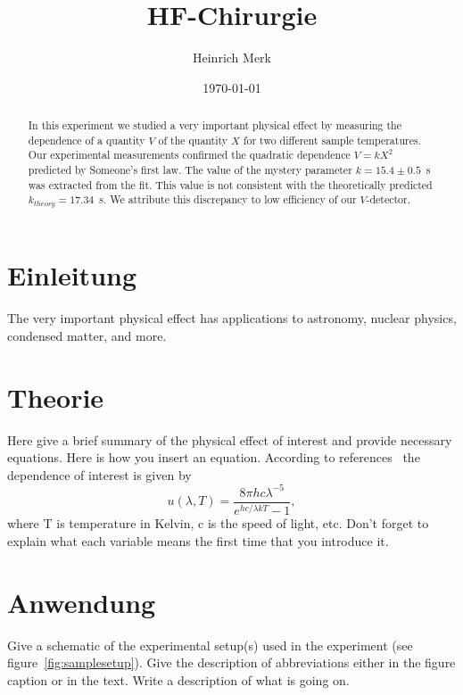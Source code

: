 \documentclass[letterpaper,12pt]{article}
\begin{document}
	
	\title{HF-Chirurgie}
	\author{Heinrich Merk}
	\date{\today}
	\maketitle
	
	\begin{abstract}
		In this experiment we studied a very important physical effect by measuring the
		dependence of a quantity $V$ of the quantity $X$ for two different sample
		temperatures.  Our experimental measurements confirmed the quadratic dependence
		$V = kX^2$ predicted by Someone's first law. The value of the mystery parameter
		$k = 15.4\pm 0.5$~s was extracted from the fit. This value is
		not consistent with the theoretically predicted $k_{theory}=17.34$~s. We attribute this
		discrepancy to low efficiency of our $V$-detector.
	\end{abstract}
	
	\section{Einleitung}
	
	The very important physical effect has applications to astronomy, nuclear physics, condensed matter, and more. 
	
	
	\section{Theorie}
	
	Here give a brief summary of the physical effect of interest and provide
	necessary equations. Here is how you insert an equation. According to
	references~\cite{melissinos, Cyr, Wiki} the dependence of interest is given
	by
	\begin{equation} \label{eq:aperp} %
		u(\lambda,T)=\frac{8\pi hc\lambda^{-5}}{e^{hc/\lambda kT}-1},
	\end{equation}
	where T is temperature in Kelvin, c is the speed of light, etc. Don't forget to
	explain what each variable means the first time that you introduce it.
	
	
	\section{Anwendung}
	
	Give a schematic of the experimental setup(s) used in the experiment (see
	figure~\ref{fig:samplesetup}). Give the description of  abbreviations
	either in the figure caption or in the text. Write a description of what is
	going on. 
	
\end{document}

